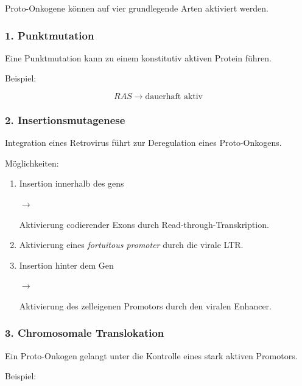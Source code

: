 Proto-Onkogene können auf vier grundlegende Arten aktiviert werden.

\subsubsection*{1. Punktmutation}

Eine Punktmutation kann zu einem
konstitutiv aktiven Protein führen.

Beispiel:

\[
    RAS
    \longrightarrow
    \text{dauerhaft aktiv}
\]


\subsubsection*{2. Insertionsmutagenese}

Integration eines Retrovirus
führt zur Deregulation
eines Proto-Onkogens.

Möglichkeiten:

\begin{enumerate}

    \item
    Insertion innerhalb des \gls{gen}s

    $\rightarrow$

    Aktivierung codierender Exons
    durch Read-through-Transkription.

    \item
    Aktivierung eines
    \emph{fortuitous promoter}
    durch die virale LTR.

    \item
    Insertion hinter dem Gen

    $\rightarrow$

    Aktivierung des zelleigenen Promotors
    durch den viralen Enhancer.

\end{enumerate}


\subsubsection*{3. Chromosomale Translokation}

Ein Proto-Onkogen gelangt
unter die Kontrolle
eines stark aktiven Promotors.

Beispiel:

